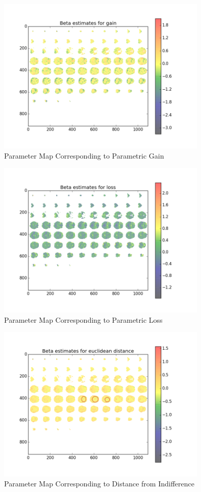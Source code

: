 \begin{figure}[h!]
\centering
\includegraphics[width=100mm]{images/parameter_map_gain.png}               
\caption{Parameter Map Corresponding to Parametric Gain}
\label{fig:beta1}
\end{figure}

\begin{figure}[h!]
\centering
\includegraphics[width=100mm]{images/parameter_map_loss.png}               
\caption{Parameter Map Corresponding to Parametric Loss}
\label{fig:beta2}
\end{figure}

\begin{figure}[h!]
\centering
\includegraphics[width=100mm]{images/parameter_map_dist.png}               
\caption{Parameter Map Corresponding to Distance from Indifference}
\label{fig:beta3}
\end{figure}

